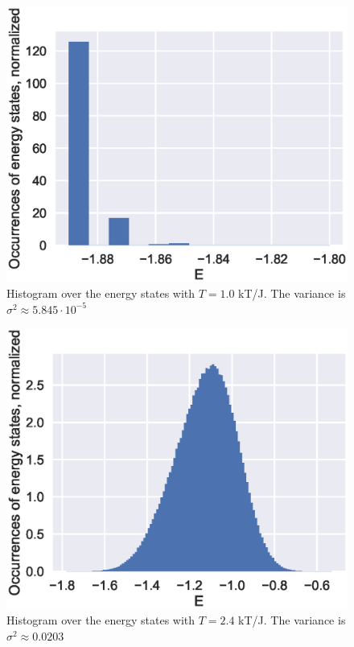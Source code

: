 \documentclass[aps,reprint]{revtex4-1}
\begin{document}
\begin{figure}[H]
  \centering
  \includegraphics[width=\columnwidth]{figures/4da.eps}
  \caption{\label{fig:4da} Histogram over the energy states with \(T=1.0\) kT/J.
  The variance is \(\sigma^{2} \approx 5.845\cdot 10^{-5}\)}
\end{figure}

\begin{figure}[H]
  \centering
  \includegraphics[width=\columnwidth]{figures/4db.eps}
  \caption{\label{fig:4db} Histogram over the energy states with \(T=2.4\) kT/J.
  The variance is \(\sigma^{2} \approx 0.0203\)}
\end{figure}
\end{document}
